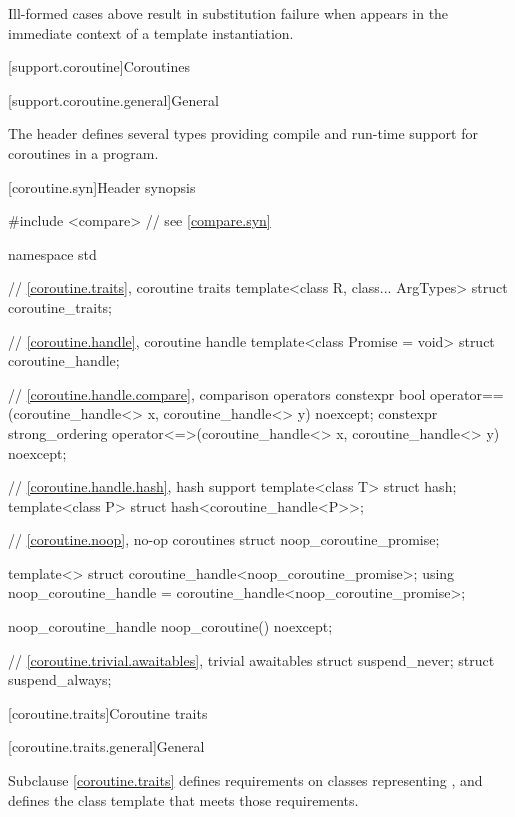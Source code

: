 \begin{note}
Ill-formed cases above result in substitution failure
when  appears in the immediate context
of a template instantiation.
\end{note}

[support.coroutine]{Coroutines}

[support.coroutine.general]{General}

\pnum
The header 
defines several types providing
compile and run-time support for
coroutines in a \Cpp{} program.

[coroutine.syn]{Header  synopsis}

%
%
\begin{codeblock}
#include <compare>              // see \ref{compare.syn}

namespace std {
  // \ref{coroutine.traits}, coroutine traits
  template<class R, class... ArgTypes>
    struct coroutine_traits;

  // \ref{coroutine.handle}, coroutine handle
  template<class Promise = void>
    struct coroutine_handle;

  // \ref{coroutine.handle.compare}, comparison operators
  constexpr bool operator==(coroutine_handle<> x, coroutine_handle<> y) noexcept;
  constexpr strong_ordering operator<=>(coroutine_handle<> x, coroutine_handle<> y) noexcept;

  // \ref{coroutine.handle.hash}, hash support
  template<class T> struct hash;
  template<class P> struct hash<coroutine_handle<P>>;

  // \ref{coroutine.noop}, no-op coroutines
  struct noop_coroutine_promise;

  template<> struct coroutine_handle<noop_coroutine_promise>;
  using noop_coroutine_handle = coroutine_handle<noop_coroutine_promise>;

  noop_coroutine_handle noop_coroutine() noexcept;

  // \ref{coroutine.trivial.awaitables}, trivial awaitables
  struct suspend_never;
  struct suspend_always;
}
\end{codeblock}

[coroutine.traits]{Coroutine traits}

[coroutine.traits.general]{General}

\pnum
Subclause \ref{coroutine.traits} defines requirements on classes representing
,
and defines the class template
that meets those requirements.

